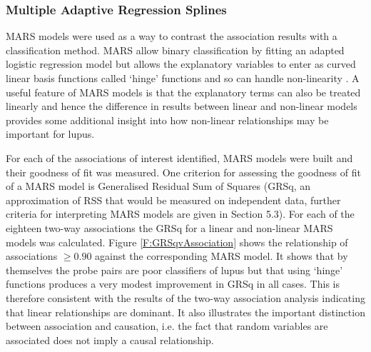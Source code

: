 \documentclass[a4paper, 12pt]{report}
\begin{document}
%

\subsubsection*{Multiple Adaptive Regression Splines}
MARS models were used as a way to contrast the association results with a classification method. MARS allow binary classification by fitting an adapted logistic regression model but allows the explanatory variables to enter as curved linear basis functions called `hinge' functions and so can handle non-linearity \cite{earth}. A useful feature of MARS models is that the explanatory terms can also be treated linearly and hence the difference in results between linear and non-linear models provides some additional insight into how non-linear relationships may be important for lupus. 

For each of the associations of interest identified, MARS models were built and their goodness of fit was measured. One criterion for assessing the goodness of fit of a MARS model is Generalised Residual Sum of Squares (GRSq, an approximation of RSS that would be measured on independent data, further criteria for interpreting MARS models are given in Section 5.3).  For each of the eighteen two-way associations the GRSq for a linear and non-linear MARS models was calculated. Figure \ref{F:GRSqvAssociation} shows the relationship of associations $\ge 0.90$ against the corresponding MARS model. It shows that by themselves the probe pairs are poor classifiers of lupus but that using `hinge' functions produces a very modest improvement in GRSq in all cases. This is therefore consistent with the results of the two-way association analysis indicating that linear relationships are dominant. It also illustrates the important distinction between association and causation, i.e. the fact that random variables are associated does not imply a causal relationship.

\end{document}
